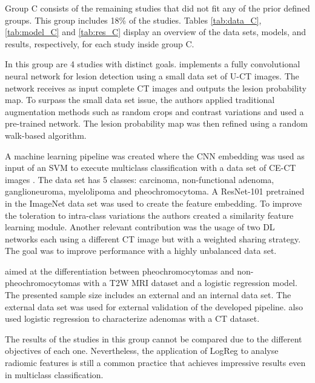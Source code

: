 \documentclass[11pt]{article}
\begin{document}
Group C consists of the remaining studies that did not fit any of the prior defined
groups.  This group includes 18\% of the studies. Tables \ref{tab:data_C},
\ref{tab:model_C} and \ref{tab:res_C} display an overview of the data sets,
models, and results, respectively, for each study inside group C.

In this group are 4 studies with distinct goals. \cite{Bi2017} implements a
fully convolutional neural network for lesion detection using a small data set
of U-CT images. The network receives as input complete CT images and outputs the
lesion probability map. To surpass the small data set issue, the authors applied
traditional augmentation methods such as random crops and contrast variations
and used a pre-trained network. The lesion probability map was then refined
using a random walk-based algorithm.

A machine learning pipeline was created where the CNN embedding was
used as input of an SVM to execute multiclass classification with a data set of
CE-CT images \cite{Bi2022}. The data set has 5 classes: carcinoma, non-functional adenoma,
ganglioneuroma, myelolipoma and pheochromocytoma. A ResNet-101 pretrained in the
ImageNet data set was used to create the feature embedding. To improve the
toleration to intra-class variations the authors created a similarity feature
learning module. Another relevant contribution was the usage of two DL networks
each using a different CT image but with a weighted sharing strategy. The goal
was to improve performance with a highly unbalanced data set.

\cite{Kong2022} aimed at the differentiation between pheochromocytomas and
non-pheochromocytomas with a T2W MRI dataset and a logistic regression model.
The presented sample size includes an external and an internal data set. The
external data set was used for external validation of the developed pipeline.
\cite{Zheng2020} also used logistic regression to characterize adenomas with
a CT dataset.

The results of the studies in this group cannot be compared due to the different
objectives of each one. Nevertheless, the application of LogReg to analyse
radiomic features is still a common practice that achieves impressive results
even in multiclass classification.
\end{document}
